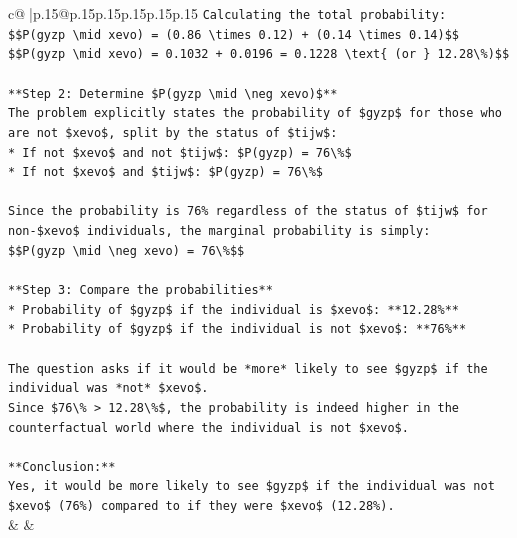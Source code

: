 \documentclass{article}
\begin{document}
{\begin{supertabular}{c@{$\;$}|p{.15\linewidth}@{}p{.15\linewidth}p{.15\linewidth}p{.15\linewidth}p{.15\linewidth}p{.15\linewidth}}
{{{\texttt{Calculating the total probability:} \\
\texttt{\$\$P(gyzp \textbackslash{}mid xevo) = (0.86 \textbackslash{}times 0.12) + (0.14 \textbackslash{}times 0.14)\$\$} \\
\texttt{\$\$P(gyzp \textbackslash{}mid xevo) = 0.1032 + 0.0196 = 0.1228 \textbackslash{}text\{ (or \} 12.28\textbackslash{}\%)\$\$} \\
\\ 
\texttt{**Step 2: Determine \$P(gyzp \textbackslash{}mid \textbackslash{}neg xevo)\$**} \\
\texttt{The problem explicitly states the probability of \$gyzp\$ for those who are not \$xevo\$, split by the status of \$tijw\$:} \\
\texttt{*   If not \$xevo\$ and not \$tijw\$: \$P(gyzp) = 76\textbackslash{}\%\$} \\
\texttt{*   If not \$xevo\$ and \$tijw\$: \$P(gyzp) = 76\textbackslash{}\%\$} \\
\\ 
\texttt{Since the probability is 76\% regardless of the status of \$tijw\$ for non{-}\$xevo\$ individuals, the marginal probability is simply:} \\
\texttt{\$\$P(gyzp \textbackslash{}mid \textbackslash{}neg xevo) = 76\textbackslash{}\%\$\$} \\
\\ 
\texttt{**Step 3: Compare the probabilities**} \\
\texttt{*   Probability of \$gyzp\$ if the individual is \$xevo\$: **12.28\%**} \\
\texttt{*   Probability of \$gyzp\$ if the individual is not \$xevo\$: **76\%**} \\
\\ 
\texttt{The question asks if it would be *more* likely to see \$gyzp\$ if the individual was *not* \$xevo\$.} \\
\texttt{Since \$76\textbackslash{}\% > 12.28\textbackslash{}\%\$, the probability is indeed higher in the counterfactual world where the individual is not \$xevo\$.} \\
\\ 
\texttt{**Conclusion:**} \\
\texttt{Yes, it would be more likely to see \$gyzp\$ if the individual was not \$xevo\$ (76\%) compared to if they were \$xevo\$ (12.28\%).} \\
            }
        }
    }
    & & \\ \\


\end{supertabular}}
\end{document}
